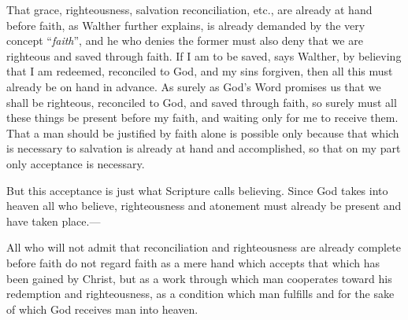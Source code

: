                 That grace, righteousness, salvation reconciliation, etc., are already at hand before faith, as Walther further explains, is already demanded by the very concept “\textit{faith}”, and he who denies the former must also deny that we are righteous and saved through faith.  If I am to be saved, says Walther, by believing that I am redeemed, reconciled to God, and my sins forgiven, then all this must already be on hand in advance.  As surely as God’s Word promises us that we shall be righteous, reconciled to God, and saved through faith, so surely must all these things be present before my faith, and waiting only for me to receive them.  That a man should be justified by faith alone is possible only because that which is necessary to salvation is already at hand and accomplished, so that on my part only acceptance is necessary. \par But this acceptance is just what Scripture calls believing.  Since God takes into heaven all who believe, righteousness and atonement must already be present and have taken place.---\par All who will not admit that reconciliation and righteousness are already complete before faith do not regard faith as a mere hand which accepts that which has been gained by Christ, but as a work through which man cooperates toward his redemption and righteousness, as a condition which man fulfills and for the sake of which God receives man into heaven.

